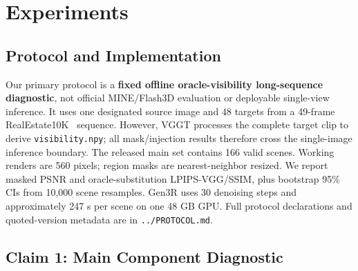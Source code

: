 \documentclass[10pt,twocolumn,letterpaper]{article}
\begin{document}
\section{Experiments}
\subsection{Protocol and Implementation}
\label{sec:protocol}
Our primary protocol is a \textbf{fixed offline oracle-visibility long-sequence
diagnostic}, not official MINE/Flash3D evaluation or deployable single-view
inference. It uses one designated source image and 48 targets from a 49-frame
RealEstate10K~\cite{realestate10k} sequence. However, VGGT processes the complete
target clip to derive \texttt{visibility.npy}; all mask/injection results therefore
cross the single-image inference boundary. The released main set contains 166
valid scenes. Working renders are 560 pixels; region masks are nearest-neighbor resized.
We report masked PSNR and oracle-substitution LPIPS-VGG/SSIM, plus bootstrap 95\%
CIs from 10,000 scene resamples. Gen3R uses 30 denoising steps and approximately
247 s per scene on one 48 GB GPU. Full protocol declarations and quoted-version
metadata are in \texttt{../PROTOCOL.md}.

\subsection{Claim 1: Main Component Diagnostic}
\begin{table}[t]
\centering\scriptsize
\caption{Fixed 759-frame full-image component diagnostic on 21 long-sequence
scenes selected for significant disocclusion. All rows use one source view, the
same stored 560-pixel working renders and metric preprocessing, and
LPIPS-VGG/FID/KID full-image metrics; this is neither official MINE nor an
official Flash3D reproduction. E-210 evaluates the stored \texttt{adaptive2}
injected output directly on every included frame, with no oracle fallback.
``Evidence ref.'' uses per-target scene-folder geometry and is not a single-view leaderboard baseline. Runtime is reported only
where released; dashes mean unavailable, not zero. Lower LPIPS/FID/KID is better.}
\label{tab:component}
\end{table}
\end{document}
